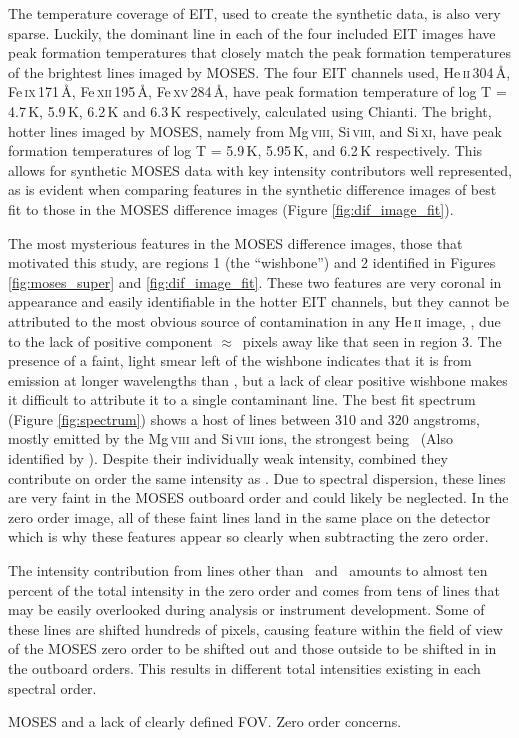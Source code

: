 	The temperature coverage of EIT, used to create the synthetic data, is also very sparse.
	Luckily, the dominant line in each of the four included EIT images have peak formation temperatures that closely match the peak formation temperatures of the brightest lines imaged by MOSES.  
	The four EIT channels used, He\,\textsc{ii}\,304\,\AA, Fe\,\textsc{ix}\,171\,\AA,  Fe\,\textsc{xii}\,195\,\AA, Fe\,\textsc{xv}\,284\,\AA, have peak formation temperature of log T = 4.7\,K, 5.9\,K, 6.2\,K and 6.3\,K respectively, calculated using Chianti.  
	The bright, hotter lines imaged by MOSES, namely from Mg\,\textsc{viii}, Si\,\textsc{viii}, and Si\,\textsc{xi}, have peak formation temperatures of log T = 5.9\,K, 5.95\,K, and 6.2\,K respectively. 
	This allows for synthetic MOSES data with key intensity contributors well represented, as is evident when comparing features in the synthetic difference images of best fit to those in the MOSES difference images (Figure \ref{fig:dif_image_fit}).
	
	The most mysterious features in the MOSES difference images, those that motivated this study, are regions 1 (the ``wishbone'') and 2 identified in Figures \ref{fig:moses_super} and \ref{fig:dif_image_fit}.
	These two features are very coronal in appearance and easily identifiable in the hotter EIT channels, but they cannot be attributed to the most obvious source of contamination in any He\,\textsc{ii} image, \sixi, due to the lack of positive component $\approx$\sixipix\ pixels away like that seen in region 3.
	The presence of a faint, light smear left of the wishbone indicates that it is from emission at longer wavelengths than \heii, but a lack of clear positive wishbone makes it difficult to attribute it to a single contaminant line.
	The best fit spectrum (Figure \ref{fig:spectrum}) shows a host of lines between 310 and 320 angstroms, mostly emitted by the Mg\,\textsc{viii} and Si\,\textsc{viii} ions, the strongest being \ (Also identified by \citet{Rust2017}).
	Despite their individually weak intensity, combined they contribute on order the same intensity as \sixi.
	Due to spectral dispersion, these lines are very faint in the MOSES outboard order and could likely be neglected.
	In the zero order image, all of these faint lines land in the same place on the detector which is why these features appear so clearly when subtracting the zero order.
	
	The intensity contribution from lines other than \heii\ and \sixi\ amounts to almost ten percent of the total intensity in the zero order and comes from tens of lines that may be easily overlooked during analysis or instrument development.
	Some of these lines are shifted hundreds of pixels, causing feature within the field of view of the MOSES zero order to be shifted out and those outside to be shifted in in the outboard orders.
	This results in different total intensities existing in each spectral order.
	
	
	MOSES and a lack of clearly defined FOV.  
	Zero order concerns.
	
	

	
	
	
	


